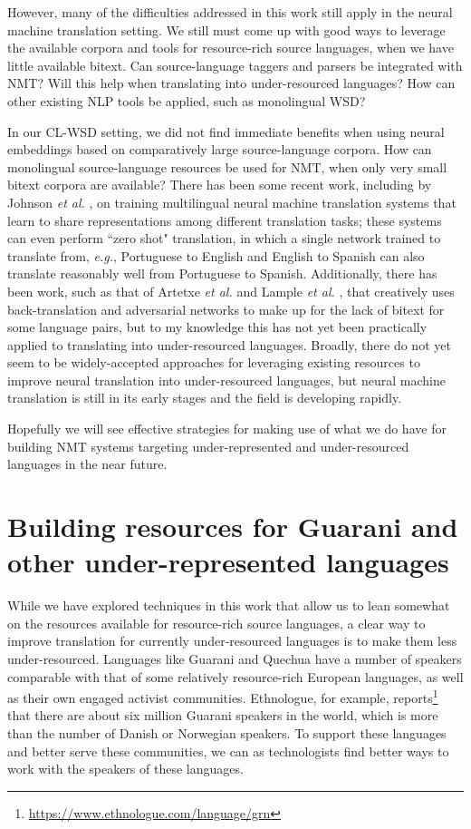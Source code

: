 However, many of the difficulties addressed in this work still apply in the
neural machine translation setting. We still must come up with good ways to
leverage the available corpora and tools for resource-rich source languages,
when we have little available bitext. Can source-language taggers and parsers
be integrated with NMT? Will this help when translating into under-resourced
languages? How can other existing NLP tools be applied, such as monolingual
WSD?

In our CL-WSD setting, we did not find immediate benefits when using neural
embeddings based on comparatively large source-language corpora. How can
monolingual source-language resources be used for NMT, when only very small
bitext corpora are available?  There has been some recent work, including by
Johnson \emph{et al.} \cite{TACL1081}, on training multilingual neural machine
translation systems that learn to share representations among different
translation tasks; these systems can even perform ``zero shot" translation, in
which a single network trained to translate from, \emph{e.g.}, Portuguese to
English and English to Spanish can also translate reasonably well from
Portuguese to Spanish.
Additionally, there has been work, such as that of Artetxe \emph{et al.}
\cite{artetxe2018unsupervised} and Lample \emph{et al.}
\cite{lample2018unsupervised}, that creatively uses back-translation and
adversarial networks to make up for the lack of bitext for some language pairs,
but to my knowledge this has not yet been practically applied to translating
into under-resourced languages.  Broadly, there do not yet seem to be
widely-accepted approaches for leveraging existing resources to improve neural
translation into under-resourced languages, but neural machine translation is
still in its early stages and the field is developing rapidly.

Hopefully we will see effective strategies for making use of what we do have
for building NMT systems targeting under-represented and under-resourced
languages in the near future.

\section{Building resources for Guarani and other under-represented languages}
\label{sec:crowdsourcing}

While we have explored techniques in this work that allow us to lean
somewhat on the resources available for resource-rich source
languages, a clear way to improve translation for currently under-resourced
languages is to make them less under-resourced. Languages like Guarani and
Quechua have a number of speakers comparable with that of some relatively
resource-rich European languages, as well as their own engaged activist
communities. Ethnologue, for example,
reports\footnote{\url{https://www.ethnologue.com/language/grn}} that there are
about six million Guarani speakers in the world, which is more than the number
of Danish or Norwegian speakers. To support these languages and better serve
these communities, we can as technologists find better ways to work with the
speakers of these languages.

